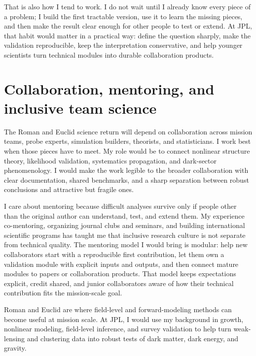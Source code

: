 \documentclass[11pt,letterpaper,sans]{moderncv}
\begin{document}
That is also how I tend to work. I do not wait until I already know every piece of a problem; I build the first tractable version, use it to learn the missing pieces, and then make the result clear enough for other people to test or extend. At JPL, that habit would matter in a practical way: define the question sharply, make the validation reproducible, keep the interpretation conservative, and help younger scientists turn technical modules into durable collaboration products.

\section{Collaboration, mentoring, and inclusive team science}
The Roman and Euclid science return will depend on collaboration across mission teams, probe experts, simulation builders, theorists, and statisticians. I work best when those pieces have to meet. My role would be to connect nonlinear structure theory, likelihood validation, systematics propagation, and dark-sector phenomenology. I would make the work legible to the broader collaboration with clear documentation, shared benchmarks, and a sharp separation between robust conclusions and attractive but fragile ones.

I care about mentoring because difficult analyses survive only if people other than the original author can understand, test, and extend them. My experience co-mentoring, organizing journal clubs and seminars, and building international scientific programs has taught me that inclusive research culture is not separate from technical quality. The mentoring model I would bring is modular: help new collaborators start with a reproducible first contribution, let them own a validation module with explicit inputs and outputs, and then connect mature modules to papers or collaboration products. That model keeps expectations explicit, credit shared, and junior collaborators aware of how their technical contribution fits the mission-scale goal.

Roman and Euclid are where field-level and forward-modeling methods can become useful at mission scale. At JPL, I would use my background in growth, nonlinear modeling, field-level inference, and survey validation to help turn weak-lensing and clustering data into robust tests of dark matter, dark energy, and gravity.
\end{document}
